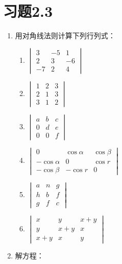 \section*{习题2.3}
\begin{enumerate}
    \item 用对角线法则计算下列行列式：
\begin{multicols}{2}
\begin{enumerate}
    \item $\begin{vmatrix}3 & -5 & 1 \\ 2 & 3 & -6 \\ -7 & 2 & 4\end{vmatrix}$
    \item $\begin{vmatrix}1 & 2 & 3 \\ 2 & 1 & 3 \\ 3 & 1 & 2\end{vmatrix}$
    \item $\begin{vmatrix}a & b & c \\ 0 & d & e \\ 0 & 0 & f\end{vmatrix}$
    \item $\begin{vmatrix}0 & \cos \alpha & \cos \beta \\ -\cos \alpha & 0 & \cos r \\ -\cos \beta & -\cos r & 0\end{vmatrix}$
    \item $\begin{vmatrix}a & n & g \\ h & b & f \\ g & f & c\end{vmatrix}$
    \item $\begin{vmatrix}x & y & x+y \\ y & x+y & x \\ x+y & x & y\end{vmatrix}$
\end{enumerate}
\end{multicols}
    \item 解方程：
\begin{enumerate}
\end{enumerate}
\end{enumerate}
